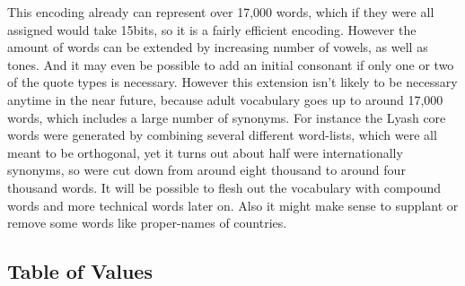 This encoding already can represent over 17,000 words, which if they
were all assigned would take 15bits, so it is a fairly efficient
encoding. However the amount of words can be extended by increasing
number of vowels, as well as tones. And it may even be possible to add
an initial consonant if only one or two of the quote types is necessary.
However this extension isn't likely to be necessary anytime in the near
future, because adult vocabulary goes up to around 17,000 words, which
includes a large number of synonyms. For instance the Lyash core words
were generated by combining several different word-lists, which were all
meant to be orthogonal, yet it turns out about half were internationally
synonyms, so were cut down from around eight thousand to around four
thousand words. It will be possible to flesh out the vocabulary with
compound words and more technical words later on. Also it might make
sense to supplant or remove some words like proper-names of countries.

\subsection{Table of Values}\label{values}

